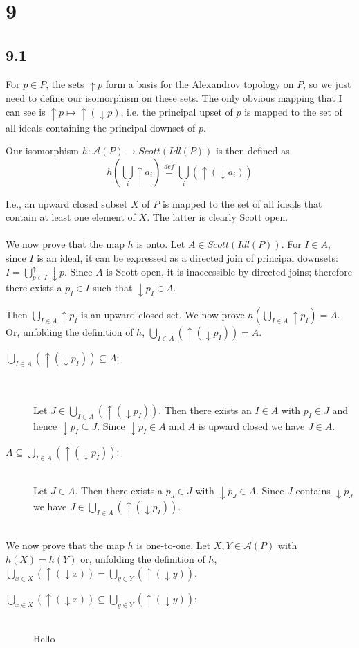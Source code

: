 \documentclass{article}
\newcommand{\defeq}{\overset{\mathit{def}}{=}}
\begin{document}
\section*{9}

\subsection*{9.1}

For $p \in P$, the sets $\uparrow p$ form a basis for the Alexandrov topology on $P$, so we just need to define our isomorphism on these sets.
The only obvious mapping that I can see is $\uparrow p \mapsto \uparrow (\downarrow p)$, i.e. the principal upset of $p$ is mapped to the set of all ideals containing the principal downset of $p$.

Our isomorphism $h : \mathcal{A}(P) \to \mathit{Scott}(\mathit{Idl}(P))$ is then defined as
$$ h( \bigcup_i  \uparrow a_i ) \defeq \bigcup_i ( \uparrow (\downarrow a_i) )$$

I.e., an upward closed subset $X$ of $P$ is mapped to the set of all ideals that contain at least one element of $X$.
The latter is clearly Scott open.\\~\\
We now prove that the map $h$ is onto. Let $A \in \mathit{Scott}(\mathit{Idl}(P))$. For $I \in A$, since $I$ is an ideal, it can be expressed as a directed join of principal downsets: $I = \bigcup^{\uparrow}_{p \in I}\downarrow p$.
Since $A$ is Scott open, it is inaccessible by directed joins; therefore there exists a $p_I \in I$ such that 
$\downarrow p_I \in A$.  

Then $\bigcup_{I \in A} \uparrow p_I$ is an upward closed set. We now prove $h(\bigcup_{I \in A} \uparrow p_I)=A$. Or, unfolding the definition of $h$, $\bigcup_{I \in A} (\uparrow (\downarrow p_I) ) = A$. 

\begin{description}

\item[$\bigcup_{I \in A} (\uparrow (\downarrow p_I) ) \subseteq A$:]~\\~\\
Let $J \in \bigcup_{I \in A} (\uparrow (\downarrow p_I) )$. Then there exists an $I \in A$ with $p_I \in J$ and hence $\downarrow p_I \subseteq J$. Since $\downarrow p_I \in A$ and $A$ is upward closed we have $J \in A$.

\item[$A \subseteq \bigcup_{I \in A} (\uparrow (\downarrow p_I) )$:]~\\

Let $J \in A$. Then there exists a $p_J \in J$ with $\downarrow p_J \in A$. Since $J$ contains $\downarrow p_J$
we have $J \in \bigcup_{I \in A} (\uparrow (\downarrow p_I) )$.

\end{description}~\\
We now prove that the map $h$ is one-to-one. Let $X,Y \in \mathcal A(P)$ with $h(X) = h(Y)$ or, unfolding the
definition of $h$, $\bigcup_{x \in X} (\uparrow (\downarrow x)) = \bigcup_{y \in Y} (\uparrow (\downarrow y))$.

\begin{description}

\item[$\bigcup_{x \in X} (\uparrow (\downarrow x)) \subseteq \bigcup_{y \in Y} (\uparrow (\downarrow y))$:]~\\

Hello

\end{description}
\end{document}
